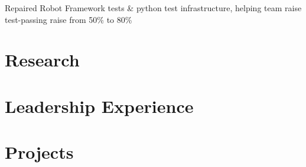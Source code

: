 \documentclass[9pt]{resume}
\begin{document}
\contentitems
{Repaired Robot Framework tests \& python test infrastructure, helping team raise test-passing raise from 50\% to 80\%}

\section{Research}


\section{Leadership Experience}

\section{Projects}
\end{document}
